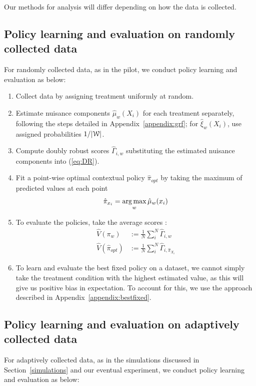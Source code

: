 \documentclass[letterpaper, 12pt, parskip=full,]{scrartcl}
\begin{document}
Our methods for analysis will differ depending on how the data is collected. 

\subsection{Policy learning and evaluation on randomly collected data}\label{randomlearning}
For randomly collected data, as in the pilot, we conduct policy learning and evaluation as below:

\begin{enumerate}
  \item Collect data by assigning treatment uniformly at random.
  \item Estimate nuisance components $\hat{\mu}_{w}(X_i)$ for each treatment separately, following the steps detailed in Appendix~\ref{appendix:grf}; for  $\hat\xi_w(X_i)$, use assigned probabilities $1/|{\EuScript W}|$. 
  \item Compute doubly robust scores $\hat{\Gamma}_{i,w}$ substituting the estimated nuisance components into (\ref{eq:DR}). 
  \item Fit a point-wise optimal contextual policy $\hat{\pi}_{opt}$ by taking the maximum of predicted values at each point
    \begin{equation*}
\hat{\pi}_{x_i}  =     \operatorname*{arg\,max}_{w} \hat{\mu}_{w}(x_i) 
    \end{equation*}
  \item To evaluate the policies, take the average scores :
    \begin{align*}
          \hat{V}({\pi}_{w})  &:= \frac{1}{N} \sum_{i}^N \hat{\Gamma}_{i,w} \\
      \hat{V}(\hat{\pi}_{opt})  &:= \frac{1}{N} \sum_{i}^N \hat{\Gamma}_{i, \hat{\pi}_{X_i}} 
          \end{align*}
   \item To learn and evaluate the best fixed policy on a dataset, we cannot simply take the treatment condition with the highest estimated value, as this will give us positive bias in expectation. To account for this, we use the approach described in Appendix~\ref{appendix:bestfixed}. 
\end{enumerate}


\subsection{Policy learning and evaluation on adaptively collected data}\label{adaptiveearning}
For adaptively collected data, as in the simulations discussed in Section~\ref{simulations} and our eventual experiment, we conduct policy learning and evaluation as below:
\end{document}

